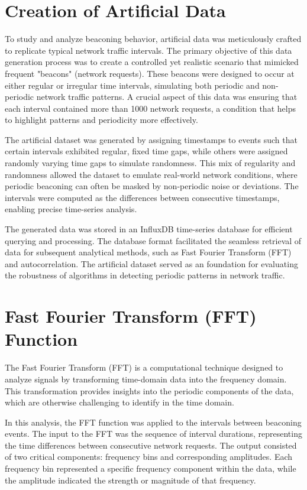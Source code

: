 \section{Creation of Artificial Data}
To study and analyze beaconing behavior, artificial data was meticulously crafted to replicate typical network traffic intervals. The primary objective of this data generation process was to create a controlled yet realistic scenario that mimicked frequent "beacons" (network requests). These beacons were designed to occur at either regular or irregular time intervals, simulating both periodic and non-periodic network traffic patterns. A crucial aspect of this data was ensuring that each interval contained more than 1000 network requests, a condition that helps to highlight patterns and periodicity more effectively.

The artificial dataset was generated by assigning timestamps to events such that certain intervals exhibited regular, fixed time gaps, while others were assigned randomly varying time gaps to simulate randomness. This mix of regularity and randomness allowed the dataset to emulate real-world network conditions, where periodic beaconing can often be masked by non-periodic noise or deviations. The intervals were computed as the differences between consecutive timestamps, enabling precise time-series analysis.

The generated data was stored in an InfluxDB time-series database for efficient querying and processing. The database format facilitated the seamless retrieval of data for subsequent analytical methods, such as Fast Fourier Transform (FFT) and autocorrelation. The artificial dataset served as an  foundation for evaluating the robustness of algorithms in detecting periodic patterns in network traffic.

\section{Fast Fourier Transform (FFT) Function}
The Fast Fourier Transform (FFT) is a computational technique designed to analyze signals by transforming time-domain data into the frequency domain. This transformation provides insights into the periodic components of the data, which are otherwise challenging to identify in the time domain.

In this analysis, the FFT function was applied to the intervals between beaconing events. The input to the FFT was the sequence of interval durations, representing the time differences between consecutive network requests. The output consisted of two critical components: frequency bins and corresponding amplitudes. Each frequency bin represented a specific frequency component within the data, while the amplitude indicated the strength or magnitude of that frequency.


